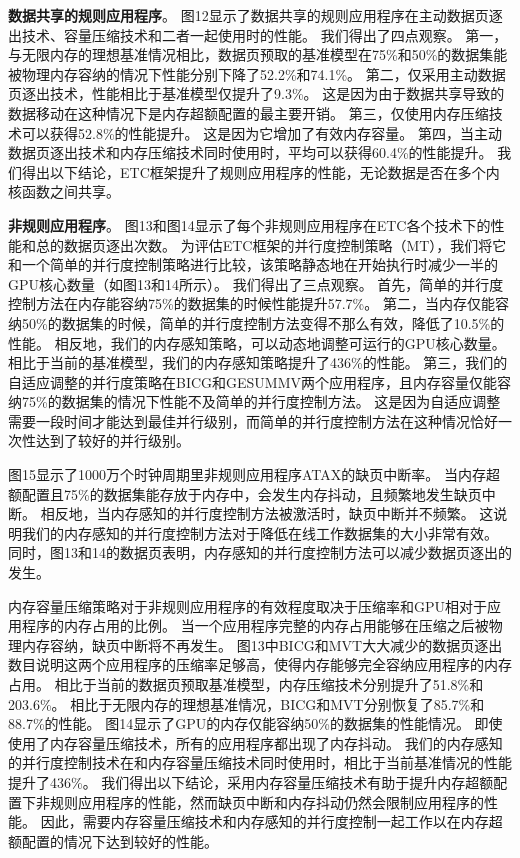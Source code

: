 \textbf{数据共享的规则应用程序}。
图12显示了数据共享的规则应用程序在主动数据页逐出技术、容量压缩技术和二者一起使用时的性能。
我们得出了四点观察。
第一，与无限内存的理想基准情况相比，数据页预取的基准模型在75\%和50\%的数据集能被物理内存容纳的情况下性能分别下降了52.2\%和74.1\%。
第二，仅采用主动数据页逐出技术，性能相比于基准模型仅提升了9.3\%。
这是因为由于数据共享导致的数据移动在这种情况下是内存超额配置的最主要开销。
第三，仅使用内存压缩技术可以获得52.8\%的性能提升。
这是因为它增加了有效内存容量。
第四，当主动数据页逐出技术和内存压缩技术同时使用时，平均可以获得60.4\%的性能提升。
我们得出以下结论，ETC框架提升了规则应用程序的性能，无论数据是否在多个内核函数之间共享。

\textbf{非规则应用程序}。
图13和图14显示了每个非规则应用程序在ETC各个技术下的性能和总的数据页逐出次数。
为评估ETC框架的并行度控制策略（MT），我们将它和一个简单的并行度控制策略进行比较，该策略静态地在开始执行时减少一半的GPU核心数量（如图13和14所示）。
我们得出了三点观察。
首先，简单的并行度控制方法在内存能容纳75\%的数据集的时候性能提升57.7\%。
第二，当内存仅能容纳50\%的数据集的时候，简单的并行度控制方法变得不那么有效，降低了10.5\%的性能。
相反地，我们的内存感知策略，可以动态地调整可运行的GPU核心数量。
相比于当前的基准模型，我们的内存感知策略提升了436\%的性能。
第三，我们的自适应调整的并行度策略在BICG和GESUMMV两个应用程序，且内存容量仅能容纳75\%的数据集的情况下性能不及简单的并行度控制方法。
这是因为自适应调整需要一段时间才能达到最佳并行级别，而简单的并行度控制方法在这种情况恰好一次性达到了较好的并行级别。

图15显示了1000万个时钟周期里非规则应用程序ATAX的缺页中断率。
当内存超额配置且75\%的数据集能存放于内存中，会发生内存抖动，且频繁地发生缺页中断。
相反地，当内存感知的并行度控制方法被激活时，缺页中断并不频繁。
这说明我们的内存感知的并行度控制方法对于降低在线工作数据集的大小非常有效。
同时，图13和14的数据页表明，内存感知的并行度控制方法可以减少数据页逐出的发生。

内存容量压缩策略对于非规则应用程序的有效程度取决于压缩率和GPU相对于应用程序的内存占用的比例。
当一个应用程序完整的内存占用能够在压缩之后被物理内存容纳，缺页中断将不再发生。
图13中BICG和MVT大大减少的数据页逐出数目说明这两个应用程序的压缩率足够高，使得内存能够完全容纳应用程序的内存占用。
相比于当前的数据页预取基准模型，内存压缩技术分别提升了51.8\%和203.6\%。
相比于无限内存的理想基准情况，BICG和MVT分别恢复了85.7\%和88.7\%的性能。
图14显示了GPU的内存仅能容纳50\%的数据集的性能情况。
即使使用了内存容量压缩技术，所有的应用程序都出现了内存抖动。
我们的内存感知的并行度控制技术在和内存容量压缩技术同时使用时，相比于当前基准情况的性能提升了436\%。
我们得出以下结论，采用内存容量压缩技术有助于提升内存超额配置下非规则应用程序的性能，然而缺页中断和内存抖动仍然会限制应用程序的性能。
因此，需要内存容量压缩技术和内存感知的并行度控制一起工作以在内存超额配置的情况下达到较好的性能。

